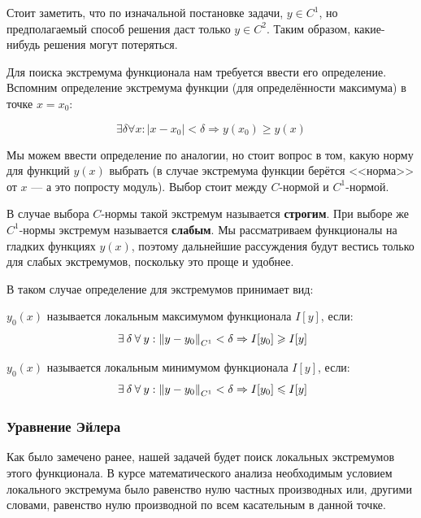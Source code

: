 \documentclass[12pt]{article}
\begin{document}

		Стоит заметить, что по изначальной постановке задачи, $y \in C^1$, но предполагаемый способ решения
		даст только $y \in C^2$. Таким образом, какие-нибудь решения могут потеряться. 

		Для поиска экстремума функционала нам требуется ввести его определение. Вспомним определение 
		экстремума функции (для определённости максимума) в точке $x=x_0$:

			$$\exists \delta \forall x: |x - x_0| < \delta \Rightarrow y(x_0) \geq y(x)$$

		Мы можем ввести определение по аналогии, но стоит вопрос в том, какую норму для функций $y(x)$ выбрать
		(в случае экстремума функции берётся <<норма>> от $x$ --- а это попросту модуль). Выбор стоит между 
		$C$-нормой и $C^1$-нормой.

		В случае выбора $C$-нормы такой экстремум называется \textbf{строгим}. При выборе же $C^1$-нормы 
		экстремум называется \textbf{слабым}. Мы рассматриваем функционалы на гладких функциях $y(x)$, 
		поэтому дальнейшие рассуждения будут вестись только для слабых экстремумов, поскольку это проще 
		и удобнее.

		В таком случае определение для экстремумов принимает вид:

		\begin{defi}
			$y_0(x)$ называется локальным максимумом функционала $I[y]$, если:
			$$\exists \delta \forall y: \norm{y - y_0}_{C^1} < \delta \Rightarrow I[y_0] \geq I[y]$$
		\end{defi}

		\begin{defi}
			$y_0(x)$ называется локальным минимумом функционала $I[y]$, если:
			$$\exists \delta \forall y: \norm{y - y_0}_{C^1} < \delta \Rightarrow I[y_0] \leq I[y]$$
		\end{defi}

	
		\subsubsection{Уравнение Эйлера}
	
			Как было замечено ранее, нашей задачей будет поиск локальных экстремумов этого функционала. В 
			курсе математического анализа необходимым условием локального экстремума было равенство нулю
			частных производных или, другими словами, равенство нулю производной по всем касательным в данной
			точке.
	
\end{document}
